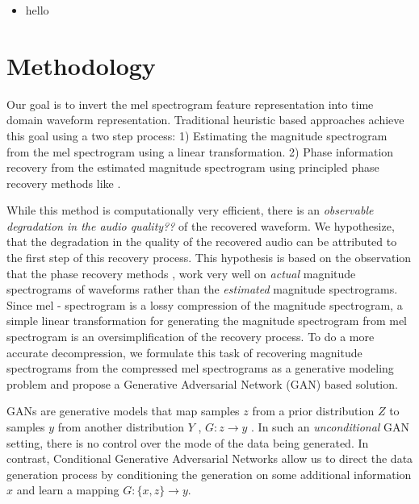 \documentclass[a4paper]{article}
\begin{document}
\begin{itemize}
    \item hello
\end{itemize}

\section{Methodology}
Our goal is to invert the mel spectrogram feature representation into time domain waveform representation. 
Traditional heuristic based approaches achieve this goal using a two step process:
1) Estimating the magnitude spectrogram from the mel spectrogram using a linear transformation.
2) Phase information recovery from the estimated magnitude spectrogram using principled phase recovery methods like \cite{lws}. 
   
While this method is computationally very efficient, there is an \textit{observable degradation in the audio quality??} of the recovered waveform. We hypothesize, that the degradation in the quality of the recovered audio can be attributed to the first step of this recovery process. This hypothesis is based on the observation that the phase recovery methods \cite{lws}, work very well on \textit{actual} magnitude spectrograms of waveforms rather than the \textit{estimated} magnitude spectrograms. 
Since mel - spectrogram is a lossy compression of the magnitude spectrogram, a simple linear transformation for generating the magnitude spectrogram from mel spectrogram is an oversimplification of the recovery process. To do a more accurate decompression, we formulate this task of recovering magnitude spectrograms from the compressed mel spectrograms as a generative modeling problem and propose a Generative Adversarial Network (GAN)\cite{} based solution.

GANs are generative models that map samples $z$ from a prior distribution $Z$ to samples $y$ from another distribution $Y$ , $G: z\rightarrow y$ \cite{goodfellow2014generative}. In such an \textit{unconditional} GAN setting, there is no control over the mode of the data being generated. In contrast, Conditional Generative Adversarial Networks \cite{condtionalGAN} allow us to direct the data generation process by conditioning the generation on some additional information $x$ and learn a mapping $G: \{x,z\}\rightarrow y$.
\end{document}
